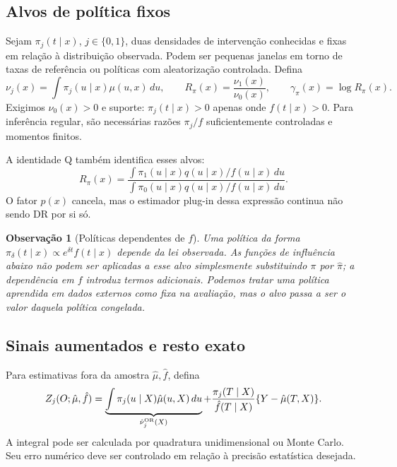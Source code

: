 \documentclass[11pt,a4paper]{article}
\newtheorem{remark}[theorem]{Observação}
\begin{document}
\subsection{Alvos de política fixos}
Sejam $\pi_j(t\mid x)$, $j\in\{0,1\}$, duas densidades de intervenção conhecidas e fixas em relação à distribuição observada. Podem ser pequenas janelas em torno de taxas de referência ou políticas com aleatorização controlada. Defina
\begin{equation}
\nu_j(x)=\int\pi_j(u\mid x)\mu(u,x)\,du,\qquad
R_\pi(x)=\frac{\nu_1(x)}{\nu_0(x)},\qquad
\gamma_\pi(x)=\log R_\pi(x).
\label{eq:policytargets}
\end{equation}
Exigimos $\nu_0(x)>0$ e suporte: $\pi_j(t\mid x)>0$ apenas onde $f(t\mid x)>0$. Para inferência regular, são necessárias razões $\pi_j/f$ suficientemente controladas e momentos finitos.

A identidade Q também identifica esses alvos:
\begin{equation}
R_\pi(x)=
\frac{\int\pi_1(u\mid x)q(u\mid x)/f(u\mid x)\,du}
     {\int\pi_0(u\mid x)q(u\mid x)/f(u\mid x)\,du}.
\label{eq:policyQ}
\end{equation}
O fator $p(x)$ cancela, mas o estimador plug-in dessa expressão continua não sendo DR por si só.

\begin{remark}[Políticas dependentes de $f$]
Uma política da forma $\pi_\delta(t\mid x)\propto e^{\delta t}f(t\mid x)$ depende da lei observada. As funções de influência abaixo não podem ser aplicadas a esse alvo simplesmente substituindo $\pi$ por $\hat\pi$; a dependência em $f$ introduz termos adicionais. Podemos tratar uma política aprendida em dados externos como fixa na avaliação, mas o alvo passa a ser o valor daquela política congelada.
\end{remark}

\subsection{Sinais aumentados e resto exato}
Para estimativas fora da amostra $\hat\mu,\hat f$, defina
\begin{equation}
Z_j(O;\hat\mu,\hat f)=
\underbrace{\int\pi_j(u\mid X)\hat\mu(u,X)\,du}_{\hat\nu_j^{\rm OR}(X)}
+\frac{\pi_j(T\mid X)}{\hat f(T\mid X)}\{Y-\hat\mu(T,X)\}.
\label{eq:Z}
\end{equation}
A integral pode ser calculada por quadratura unidimensional ou Monte Carlo. Seu erro numérico deve ser controlado em relação à precisão estatística desejada.
\end{document}
